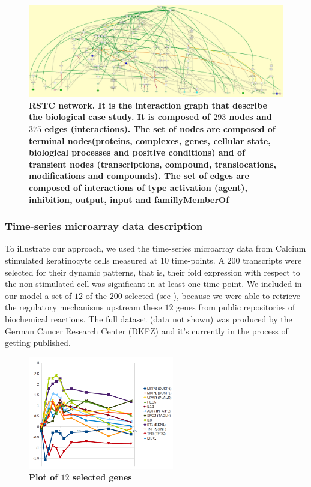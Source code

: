 \begin{figure}[!t]
 \centering
 \includegraphics[width=6.5in]{images/net.jpg}
\caption{{\bf RSTC network. It is the interaction graph that describe the biological case study. It is composed of $293$ nodes and $375$ edges (interactions).
The set of nodes are composed of terminal nodes(proteins, complexes, genes, cellular state, biological processes and positive conditions) and of transient
nodes (transcriptions, compound, translocations, modifications and compounds). The set of edges are composed of interactions of type activation (agent), inhibition, output, 
input and famillyMemberOf}} 
 \label{fig:network}
\end{figure}

\subsubsection{Time-series microarray data description}
\label{SECTSD}
To illustrate our approach, we used the time-series microarray data from Calcium stimulated keratinocyte cells 
 measured at $10$ time-points. A $200$ transcripts were selected for their dynamic patterns,
that is, their fold expression with respect to the non-stimulated cell was significant in at least one time point. 
We included in our model a set of $12$ of the $200$ selected (see ), because we were able to retrieve the regulatory mechanisms upstream
these $12$ genes from public repositories of biochemical reactions.
The full dataset (data not shown) was produced by the German Cancer Research Center (DKFZ) and it's currently in the process
of getting published.  

\begin{figure}[!t]
\centering
\includegraphics[width=2.5in]{images/12genes.png}
\caption{\bf Plot of $12$ selected genes}
\label{fig:tsd}
\end{figure}


